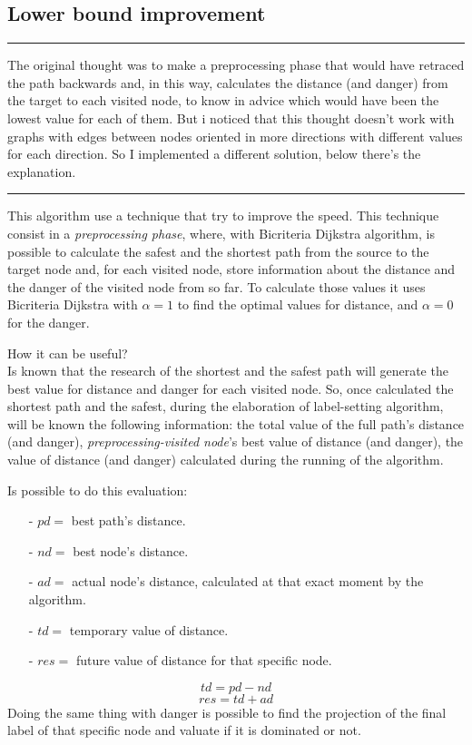 \documentclass[a4paper,11pt]{report}
\begin{document}
\subsection{Lower bound improvement}
\begin{center}
	\noindent\rule{8cm}{0.1pt}
\end{center}
{\small The original thought was to make a preprocessing phase that would have retraced the path backwards and, in this way, calculates the distance (and danger) from the target to each visited node, to know in advice which would have been the lowest value for each of them. But i noticed that this thought doesn't work with graphs with edges between nodes oriented in more directions with different values for each direction. So I implemented a different solution, below there's the explanation.}
\begin{center}
	\noindent\rule{8cm}{0.1pt}
\end{center}
This algorithm use a technique that try to improve the speed. This technique consist in a \textit{preprocessing phase}, where, with Bicriteria Dijkstra algorithm, is possible to calculate the safest and the shortest path from the source to the target node and, for each visited node, store information about the distance and the danger of the visited node from so far. To calculate those values it uses Bicriteria Dijkstra with $\alpha = 1$ to find the optimal values for distance, and $\alpha = 0$ for the danger.

How it can be useful?
\\
Is known that the research of the shortest and the safest path will generate the best value for distance and danger for each visited node. So, once calculated the shortest path and the safest, during the elaboration of label-setting algorithm, will be known the following information: the total value of the full path's distance (and danger), \textit{preprocessing-visited node}'s best value of distance (and danger), the value of distance (and danger) calculated during the running of the algorithm. 

Is possible to do this evaluation:
\begin{itemize}
	\item[-] $pd =$ best path's distance.
	\item[-] $nd =$ best node's distance.
	\item[-] $ad =$ actual node's distance, calculated at that exact moment by the algorithm.
	\item[-] $td =$ temporary value of distance.
	\item[-] $res =$ future value of distance for that specific node.
\end{itemize}
$$ td = pd - nd$$
$$res = td + ad$$
Doing the same thing with danger is possible to find the projection of the final label of that specific node and valuate if it is dominated or not.
\end{document}
